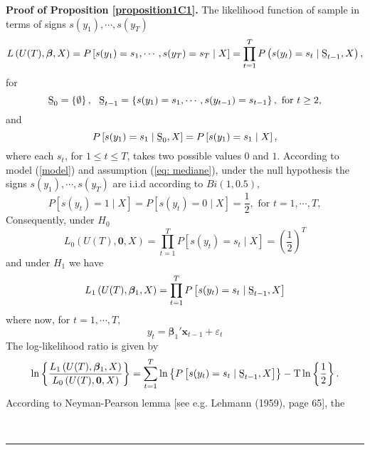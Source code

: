 \documentclass[harvard,11pt]{article}
\newenvironment{proof}[1][Proof]{\textbf{#1.} }{\  \rule{0.5em}{0.5em}}
\begin{document}
\begin{proof}[Proof of Proposition \protect\ref{proposition1C1}]
The likelihood function of sample in terms of signs $s(y_{1}),\cdots,s(y_{T})$%
\begin{equation*}
L\left( U(T),\bm{\beta},X \right) =P\left[
s(y_{1})=s_{1},\cdots,s(y_{T})=s_{T}\mid X\right] =\prod\limits_{t=1}^{T}%
P\left( s(y_{t})=s_{t}\mid \text{\b{S}}_{t-1},X\right) ,
\end{equation*}%
for 
\begin{equation*}
\text{\b{S}}_{0}=\left\{ \emptyset \right\} ,\text{ \ \b{S}}_{t-1}=\left\{
s(y_{1})=s_{1},\cdots,s(y_{t-1})=s_{t-1}\right\} ,\text{ for }t\geq 2,
\end{equation*}%
and%
\begin{equation*}
P\left[ s(y_{1})=s_{1}\mid \text{\b{S}}_{0},X\right] =P%
\left[ s(y_{1})=s_{1}\mid X\right] ,
\end{equation*}%
where each $s_{t}$, for $1\leq t\leq T$, takes two possible values $0$ and $%
1 $. According to model (\ref{model}) and assumption (\ref{eq: mediane}), under the null hypothesis the signs $s(y_1),\cdots,s(y_T)$ are i.i.d according to $Bi(1,0.5)$,
\begin{equation*}
P\left[ s(y_{t})=1\mid X\right] =P\left[ s(y_{t})=0\mid X\right] =%
\frac{1}{2},\text{ for }t=1,\cdots,T,
\end{equation*}%
Consequently, under $H_{0}$%
\begin{equation*}
L_{0}\left( U(T),\bm{0},X\right) =\prod\limits_{t=1}^{T}P\left[ s(y_{t})=s_{t}\mid X\right] =\left( \frac{1}{2}\right) ^{T}
\end{equation*}%
and under $H_{1}$ we have%
\begin{equation*}
L_{1}\left( U(T),\bm{\beta}_{1},X\right) =\prod\limits_{t=1}^{T}%
P\left[ s(y_{t})=s_{t}\mid \text{\b{S}}_{t-1}, X\right]
\end{equation*}%
where now, for $t=1,\cdots,T,$%
\begin{equation*}
y_{t}=\bm{\beta}_1'\bm{x}_{t-1}+\varepsilon_{t}
\end{equation*}%
The log-likelihood ratio is given by%
\begin{equation*}
\ln \left\{ \frac{L_{1}\left( U(T),\bm{\beta}_{1},X\right) }{L%
_{0}\left( U(T),\bm{0},X\right) }\right\} =\sum\limits_{t=1}^{T}\ln \left\{ 
P\left[ s(y_{t})=s_{t}\mid \text{\b{S}}_{t-1},X\right] \right\} -\text{T}\ln
\left\{ \frac{1}{2}\right\} .
\end{equation*}%
According to Neyman-Pearson lemma [see e.g. Lehmann (1959), page 65], the

\end{proof}
\end{document}
